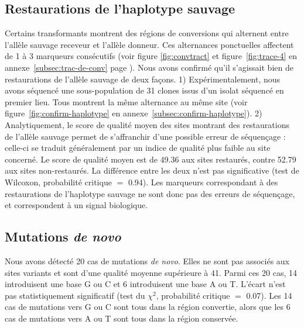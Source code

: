 \subsection{Restaurations de l'haplotype sauvage}
\label{subsec:restaur}

Certains transformants montrent des régions de conversions qui alternent entre
l'allèle sauvage receveur et l'allèle donneur. Ces alternances ponctuelles
affectent de 1 à 3 marqueurs consécutifs (voir figure \ref{fig:convtract} et
figure~\ref{fig:trace-4} en annexe~\ref{subsec:trac-de-conv}
page \pageref{fig:trace-4}). Nous avons confirmé qu'il s'agissait bien de
restaurations de l'allèle sauvage de deux façons. 1) Expérimentalement, nous
avons séquencé une sous-population de \num{31} clones issus d'un isolat séquencé en
premier lieu. Tous montrent la même alternance au même site (voir
figure~\ref{fig:confirm-haplotype} en annexe~\ref{subsec:confirm-haplotype}). 2)
Analytiquement, le score de qualité moyen des sites montrant des restaurations
de l'allèle sauvage permet de s'affranchir d'une possible erreur de séquençage :
celle-ci se traduit généralement par un indice de qualité plus faible au site
concerné. Le score de qualité moyen est de \num{49.36} aux sites restaurés,
contre \num{52.79} aux sites non-restaurés. La différence entre les deux n'est
pas significative (test de Wilcoxon, probabilité critique \(=\) \num{0.94}). Les
marqueurs correspondant à des restaurations de l'haplotype sauvage ne sont donc
pas des erreurs de séquençage, et correspondent à un signal biologique.

\subsection{Mutations \emph{de novo}}
\label{subsec:result-neomutat}

Nous avons détecté \num{20} cas de mutations \emph{de novo}. Elles ne sont pas
associés aux sites variants et sont d'une qualité moyenne supérieure à \num{41}.
Parmi ces \num{20} cas, \num{14} introduisent une base G ou C et 6 introduisent
une base A ou T. L'écart n'est pas statistiquement significatif (test du
$\chi^2$, probabilité critique \(=\) \num{0.07}). Les \num{14} cas de mutations
vers G ou C sont tous dans la région convertie, alors que les \num{6} cas de
mutations vers A ou T sont tous dans la région conservée.


